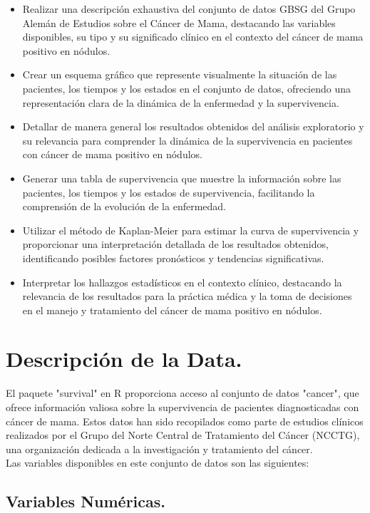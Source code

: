 \documentclass[10pt,a4paper]{article}
\begin{document}
\begin{itemize}
\item Realizar una descripción exhaustiva del conjunto de datos GBSG del Grupo Alemán de Estudios sobre el Cáncer de Mama, destacando las variables disponibles, su tipo y su significado clínico en el contexto del cáncer de mama positivo en nódulos.
\item Crear un esquema gráfico que represente visualmente la situación de las pacientes, los tiempos y los estados en el conjunto de datos, ofreciendo una representación clara de la dinámica de la enfermedad y la supervivencia.
\item Detallar de manera general los resultados obtenidos del análisis exploratorio y su relevancia para comprender la dinámica de la supervivencia en pacientes con cáncer de mama positivo en nódulos.
\item Generar una tabla de supervivencia que muestre la información sobre las pacientes, los tiempos y los estados de supervivencia, facilitando la comprensión de la evolución de la enfermedad.
\item Utilizar el método de Kaplan-Meier para estimar la curva de supervivencia y proporcionar una interpretación detallada de los resultados obtenidos, identificando posibles factores pronósticos y tendencias significativas.
\item Interpretar los hallazgos estadísticos en el contexto clínico, destacando la relevancia de los resultados para la práctica médica y la toma de decisiones en el manejo y tratamiento del cáncer de mama positivo en nódulos.
\end{itemize}

\newpage
\section{Descripción de la Data.}
El paquete "survival" en R proporciona acceso al conjunto de datos "cancer", que ofrece información valiosa sobre la supervivencia de pacientes diagnosticadas con cáncer de mama. Estos datos han sido recopilados como parte de estudios clínicos realizados por el Grupo del Norte Central de Tratamiento del Cáncer (NCCTG), una organización dedicada a la investigación y tratamiento del cáncer.
\\
Las variables disponibles en este conjunto de datos son las siguientes:

\subsection{Variables Numéricas.}
\end{document}

